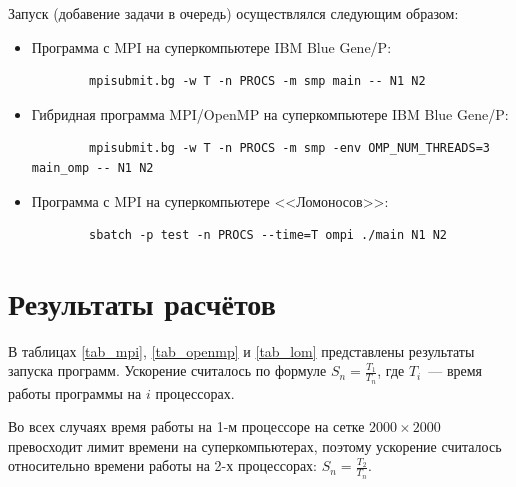 \documentclass[11pt]{article}
\numberwithin{equation}{section}
\theoremstyle{plain}
\theoremstyle{definition}
\begin{document}
Запуск (добавение задачи в очередь) осуществлялся следующим образом:
\begin{itemize}
    \item Программа с MPI на суперкомпьютере IBM Blue Gene/P:
        \begin{verbatim}
        mpisubmit.bg -w T -n PROCS -m smp main -- N1 N2
        \end{verbatim}
    \item Гибридная программа MPI/OpenMP на суперкомпьютере IBM Blue Gene/P:
        \begin{verbatim}
        mpisubmit.bg -w T -n PROCS -m smp -env OMP_NUM_THREADS=3 main_omp -- N1 N2
        \end{verbatim}
    \item Программа с MPI на суперкомпьютере <<Ломоносов>>:
        \begin{verbatim}
        sbatch -p test -n PROCS --time=T ompi ./main N1 N2
        \end{verbatim}
\end{itemize}

\newpage
\section{Результаты расчётов}

В таблицах \ref{tab_mpi}, \ref{tab_openmp} и \ref{tab_lom} представлены результаты
запуска программ. Ускорение считалось по формуле $S_n=\frac{T_1}{T_n}$, где
$T_i$~--- время работы программы на $i$ процессорах.

Во всех случаях время работы на 1-м процессоре на сетке $2000\times2000$ превосходит
лимит времени на суперкомпьютерах, поэтому ускорение считалось относительно
времени работы на 2-х процессорах: $S_n=\frac{T_2}{T_n}$.
\end{document}
